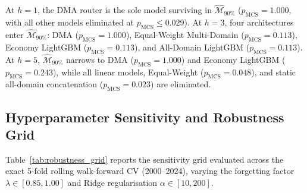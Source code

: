 \documentclass[11pt,a4paper]{article}
\begin{document}
At $h=1$, the DMA router is the sole model surviving in $\widehat{\mathcal{M}}_{90\%}$ ($p_{\text{MCS}} = 1.000$, with all other models eliminated at $p_{\text{MCS}} \le 0.029$). At $h=3$, four architectures enter $\widehat{\mathcal{M}}_{90\%}$: DMA ($p_{\text{MCS}} = 1.000$), Equal-Weight Multi-Domain ($p_{\text{MCS}} = 0.113$), Economy LightGBM ($p_{\text{MCS}} = 0.113$), and All-Domain LightGBM ($p_{\text{MCS}} = 0.113$). At $h=5$, $\widehat{\mathcal{M}}_{90\%}$ narrows to DMA ($p_{\text{MCS}} = 1.000$) and Economy LightGBM ($p_{\text{MCS}} = 0.243$), while all linear models, Equal-Weight ($p_{\text{MCS}} = 0.048$), and static all-domain concatenation ($p_{\text{MCS}} = 0.023$) are eliminated.

\subsection{Hyperparameter Sensitivity and Robustness Grid}

Table~\ref{tab:robustness_grid} reports the sensitivity grid evaluated across the exact 5-fold rolling walk-forward CV (2000--2024), varying the forgetting factor $\lambda \in [0.85, 1.00]$ and Ridge regularisation $\alpha \in [10, 200]$.
\end{document}
